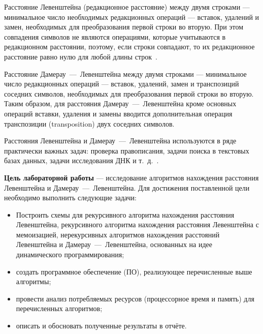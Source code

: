 
Расстояние Левенштейна (редакционное расстояние) между двумя строками --- минимальное число необходимых редакционных операций --- вставок, удалений и замен, необходимых для преобразования первой строки во вторую. При этом совпадения символов не являются операциями, которые учитываются в
редакционном расстоянии, поэтому, если строки совпадают, то их редакционное
расстояние равно нулю для любой длины строк~\cite{ulianov}. 

Расстояние Дамерау~---~Левенштейна между двумя строками --- минимальное число редакционных операций --- вставок, удалений, замен и транспозиций соседних символов, необходимых для преобразования первой строки во вторую. Таким образом, для расстояния Дамерау~---~Левенштейна кроме основных операций вставки, удаления и замены вводится дополнительная операция транспозиции (transposition) двух соседних символов.

Расстояния Левенштейна и Дамерау~---~Левенштейна используются в ряде практически важных задач: проверка правописания, задачи поиска в текстовых базах данных, задачи исследования ДНК и т.~д.~\cite{ulianov}.

\textbf{Цель лабораторной работы} --- исследование алгоритмов нахождения расстояния Левенштейна и Дамерау~---~Левенштейна. Для достижения поставленной цели необходимо выполнить следующие задачи:

\begin{itemize}
\item Построить схемы для рекурсивного алгоритма нахождения расстояния Левенштейна, рекурсивного алгоритма нахождения расстояния Левенштейна с мемоизацией, нерекурсивных алгоритмов нахождения расстояний Левенштейна и Дамерау~---~Левенштейна, основанных на идее динамического программирования;
\item создать программное обеспечение (ПО), реализующее перечисленные выше алгоритмы;
\item провести анализ потребляемых ресурсов (процессорное время и память) для перечисленных алгоритмов;
\item описать и обосновать полученные результаты в отчёте.
\end{itemize}
